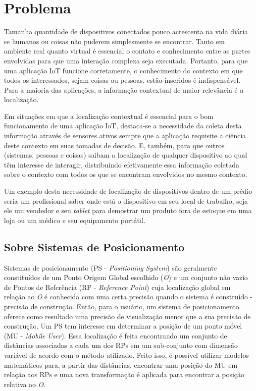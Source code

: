 \section{Problema}
\label{sec:Problema}

Tamanha quantidade de dispositivos conectados pouco acrescenta na vida diária se
humanos ou coisas não puderem simplesmente se encontrar. Tanto em ambiente real
quanto virtual é essencial o contato e conhecimento entre as partes envolvidas
para que uma interação complexa seja executada. Portanto, para que uma aplicação
IoT funcione corretamente, o conhecimento do contexto em que todos os
interessados, sejam coisas ou pessoas, estão inseridos é indispensável. Para a
maioria das aplicações, a informação contextual de maior relevância é a
localização.

Em situações em que a localização contextual é essencial para o bom funcionamento
de uma aplicação IoT, destaca-se a necessidade da coleta desta informação através
de sensores ativos sempre que a aplicação requisite a ciência deste contexto
em suas tomadas de decisão. E, também, para que outros (sistemas, pessoas e coisas)
saibam a localização de qualquer dispositivo ao qual têm interesse de interagir,
distribuindo efetivamente essa informação coletada sobre o contexto com todos os
que se encontram envolvidos no mesmo contexto.

Um exemplo desta necessidade de localização de dispositivos dentro de um prédio
seria um profissional saber onde está o dispositivo em seu local de trabalho,
seja ele um vendedor e seu \emph{tablet} para demostrar um produto fora de
estoque em uma loja ou um médico e seu equipamento portátil.

\subsection{Sobre Sistemas de Posicionamento}
\label{subsec:Sobre Sistemas de Posicionamento}

Sistemas de posicionamento (PS - \emph{Positioning System}) são geralmente
constituídos de um Ponto Origem Global escolhido (\emph{O}) e um conjunto não
vazio de Pontos de Referência (RP - \emph{Reference Point}) cuja localização
global em relação ao \emph{O} é conhecida com uma certa precisão quando o sistema
é construído - precisão de construção. Então, para o usuário, um sistema de posicionamento
oferece como resultado uma precisão de visualização menor que a sua precisão de construção.
Um PS tem interesse em determinar a posição de um ponto móvel (MU - \emph{Mobile User}).
Essa localização é feita encontrando um conjunto de distâncias associadas a cada um dos RPs em um
sub-conjunto com dimensão variável de acordo com o método utilizado. Feito isso, é
possível utilizar modelos matemáticos para, a partir das distâncias, encontrar
uma posição do MU em relação aos RPs e uma nova transformação é aplicada para
encontrar a posição relativa ao \emph{O}.

